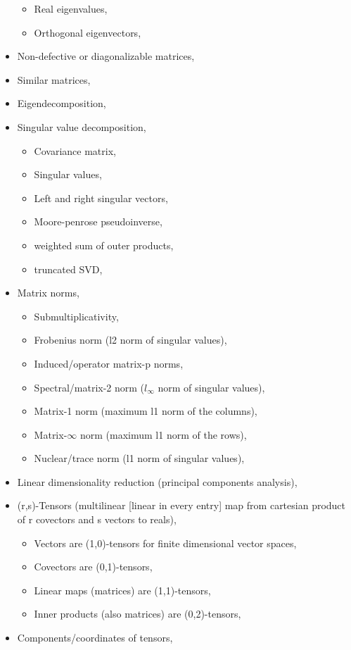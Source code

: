 \begin{itemize}
  \begin{itemize}
  \tightlist
  \item
    Real eigenvalues,
  \item
    Orthogonal eigenvectors,
  \end{itemize}
\item
  Non-defective or diagonalizable matrices,
\item
  Similar matrices,
\item
  Eigendecomposition,
\item
  Singular value decomposition,

  \begin{itemize}
  \tightlist
  \item
    Covariance matrix,
  \item
    Singular values,
  \item
    Left and right singular vectors,
  \item
    Moore-penrose pseudoinverse,
  \item
    weighted sum of outer products,
  \item
    truncated SVD,
  \end{itemize}
\item
  Matrix norms,

  \begin{itemize}
  \tightlist
  \item
    Submultiplicativity,
  \item
    Frobenius norm (l2 norm of singular values),
  \item
    Induced/operator matrix-p norms,
  \item
    Spectral/matrix-2 norm (\(l_{\infty}\) norm of singular values),
  \item
    Matrix-1 norm (maximum l1 norm of the columns),
  \item
    Matrix-\(\infty\) norm (maximum l1 norm of the rows),
  \item
    Nuclear/trace norm (l1 norm of singular values),
  \end{itemize}
\item
  Linear dimensionality reduction (principal components analysis),
\item
  (r,s)-Tensors (multilinear {[}linear in every entry{]} map from
  cartesian product of r covectors and s vectors to reals),

  \begin{itemize}
  \tightlist
  \item
    Vectors are (1,0)-tensors for finite dimensional vector spaces,
  \item
    Covectors are (0,1)-tensors,
  \item
    Linear maps (matrices) are (1,1)-tensors,
  \item
    Inner products (also matrices) are (0,2)-tensors,
  \end{itemize}
\item
  Components/coordinates of tensors,


\end{itemize}

